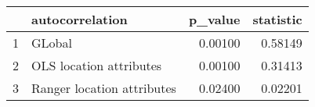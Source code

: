\begin{table}[ht]
\centering
\begin{tabular}{rlrr}
  \hline
 & autocorrelation & p\_value & statistic \\ 
  \hline
1 & GLobal & 0.00100 & 0.58149 \\ 
  2 & OLS location attributes & 0.00100 & 0.31413 \\ 
  3 & Ranger location attributes & 0.02400 & 0.02201 \\ 
   \hline
\end{tabular}
\end{table}
